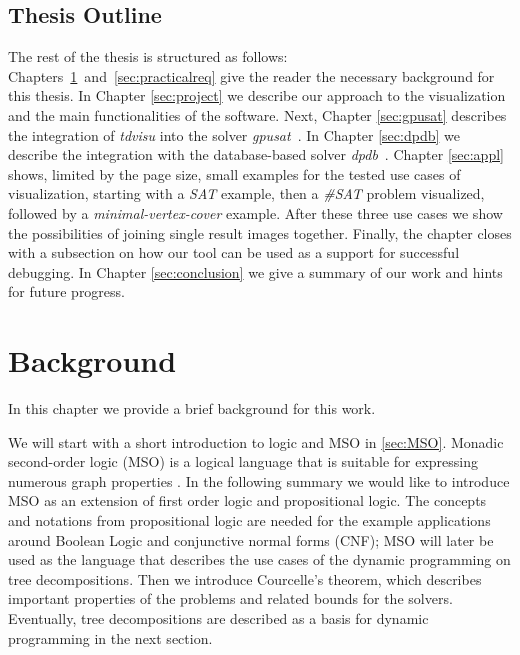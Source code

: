 \documentclass[a4paper, 12pt, bibliography=totoc]{scrartcl}
\begin{document}
\subsection{Thesis Outline}
The rest of the thesis is structured as follows: \\
Chapters~\ref{sec:bg}~and~\ref{sec:practicalreq} give the reader the necessary background for this thesis. In Chapter \ref{sec:project} we describe our approach to the visualization and the main functionalities of the software. Next, Chapter \ref{sec:gpusat} describes the integration of \textit{tdvisu} into the solver \textit{gpusat}~\cite{DiplomarbeitZisser}. In Chapter \ref{sec:dpdb} we describe the integration with the database-based solver \textit{dpdb}~\cite{dpdbpadl2020}.
Chapter \ref{sec:appl} shows, limited by the page size, small examples for the tested use cases of visualization, starting with a \textit{SAT} example, then a \textit{\#SAT} problem visualized, followed by a \textit{minimal-vertex-cover} example. After these three use cases we show the possibilities of joining single result images together. Finally, the chapter closes with a subsection on how our tool can be used as a support for successful debugging. In Chapter \ref{sec:conclusion} we give a summary of our work and hints for future progress.


\newpage
\section{Background}\label{sec:bg}
In this chapter we provide a brief background for this work.

We will start with a short introduction to logic and MSO in \ref{sec:MSO}. Monadic second-order logic (MSO) is a logical language that is suitable for expressing numerous graph properties \cite[p.~41]{Courcelle2012}. In the following summary we would like to introduce MSO as an extension  of first order logic and propositional logic. The concepts and notations from propositional logic are needed for the example applications around Boolean Logic and conjunctive normal forms (CNF); MSO will later be used as the language that describes the use cases of the dynamic programming on tree decompositions.
Then we introduce Courcelle's theorem, which describes important properties of the problems and related bounds for the solvers.
Eventually, tree decompositions are described as a basis for dynamic programming in the next section.
\end{document}
